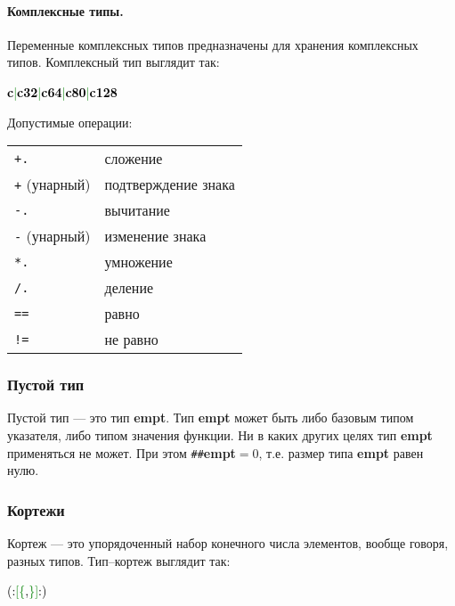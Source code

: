 \documentclass[10pt]{report}
\begin{document}
            \paragraph{Комплексные типы.}Переменные комплексных типов предназначены для хранения комплексных типов. Комплексный тип выглядит так:
\begin{center}
\noindent\textcolor{Green}{\textcolor{Black}{\textbf{c}}|\textcolor{Black}{\textbf{c32}}|\textcolor{Black}{\textbf{c64}}|\textcolor{Black}{\textbf{c80}}|\textcolor{Black}{\textbf{c128}}}
\end{center}

Допустимые операции:
\begin{longtable}{ll}
\texttt{+.}             & сложение                                          \\
\texttt{+} (унарный)    & подтверждение знака                               \\
\texttt{-.}             & вычитание                                         \\
\texttt{-} (унарный)    & изменение знака                                   \\
\texttt{*.}             & умножение                                         \\
\texttt{/.}             & деление                                           \\
\texttt{==}             & равно                                             \\
\texttt{!=}             & не равно                                          \\
\end{longtable}
        

        \subsubsection{Пустой тип}
Пустой тип --- это тип \textbf{empt}. Тип \textbf{empt} может быть либо базовым типом указателя, либо типом значения функции. Ни в каких других целях тип \textbf{empt} применяться не может. При этом \texttt{\#\#}\textbf{empt}$=0$, т.е. размер типа \textbf{empt} равен нулю.

        \subsubsection{Кортежи}
Кортеж --- это упорядоченный набор конечного числа элементов, вообще говоря, разных типов. Тип--кортеж выглядит так:
\begin{center}
\noindent\textcolor{Green}{\textcolor{Black}{(:}[\{\textcolor{Black}{,}\}]\textcolor{Black}{:)}}
\end{center}        
   
\end{document}
